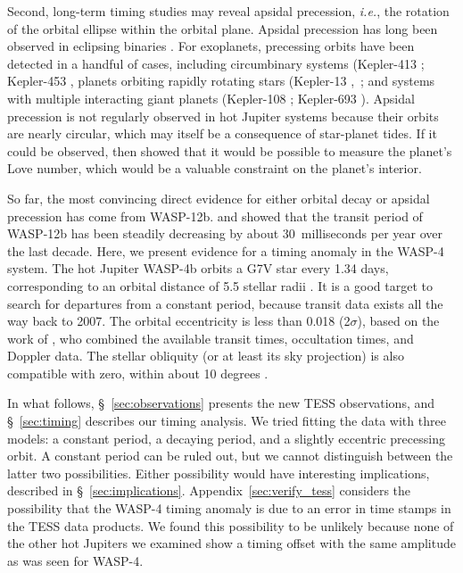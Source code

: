 \documentclass[12pt,twocolumn,tighten]{aastex62}
\begin{document}
Second, long-term timing studies may reveal apsidal precession, {\it
  i.e.}, the rotation of the orbital ellipse within the orbital
plane. Apsidal precession has long been observed in eclipsing binaries
\citep[{\it e.g.},][]{
  schwarzschild_structure_1958,torres_accurate_2010,borkovits_eclipse_2015}.
For exoplanets, precessing orbits have been detected in a handful of
cases, including circumbinary systems (Kepler-413
\citealt{kostov_kepler-413b_2014}; Kepler-453
\citealt{welsh_kepler_2015}, planets orbiting rapidly rotating stars
(Kepler-13
\citealt{szabo_spin-orbit_2012,szabo_mapping_2014},~\citealt{masuda_spin-orbit_2015};
and systems with multiple interacting giant planets (Kepler-108
\citealt{mills_kepler-108_2017}; Kepler-693
\citealt{masuda_eccentric_2017}).  Apsidal precession is not regularly
observed in hot Jupiter systems because their orbits are nearly
circular, which may itself be a consequence of star-planet tides.  If
it could be observed, then \citep{ragozzine_probing_2009} showed that
it would be possible to measure the planet's Love number, which would
be a valuable constraint on the planet's interior.

So far, the most convincing direct evidence for either orbital decay
or apsidal precession has come from WASP-12b.
\citet{maciejewski_departure_2016} and \citet{patra_2017} showed that
the transit period of WASP-12b has been steadily decreasing by about
30~milliseconds per year over the last decade.  Here, we present
evidence for a timing anomaly in the WASP-4 system.  The hot Jupiter
WASP-4b orbits a G7V star every 1.34 days, corresponding to an orbital
distance of 5.5 stellar radii
\citep{wilson_wasp-4b_2008,hoyer_tramos_2013}.  It is a good target to
search for departures from a constant period, because transit data
exists all the way back to 2007.  The orbital eccentricity is less
than 0.018 (2$\sigma$), based on the work of
\cite{knutson_friends_2014}, who combined the available transit times,
occultation times, and Doppler data.  The stellar obliquity (or at
least its sky projection) is also compatible with zero, within about
10 degrees
\citep{triaud_spin-orbit_2010,beerer_secondary_2011,sanchis-ojeda_starspots_2011}.

In what follows, \S~\ref{sec:observations} presents the new TESS
observations, and \S~\ref{sec:timing} describes our timing
analysis.  We tried fitting the data with three models: a constant
period, a decaying period, and a slightly eccentric precessing orbit.
A constant period can be ruled out, but we cannot distinguish between
the latter two possibilities.  Either possibility would have
interesting implications, described in \S~\ref{sec:implications}.
Appendix~\ref{sec:verify_tess} considers the possibility that the
WASP-4 timing anomaly is due to an error in time stamps in the TESS
data products.  We found this possibility to be unlikely because none
of the other hot Jupiters we examined show a timing offset with the
same amplitude as was seen for WASP-4.
\end{document}
